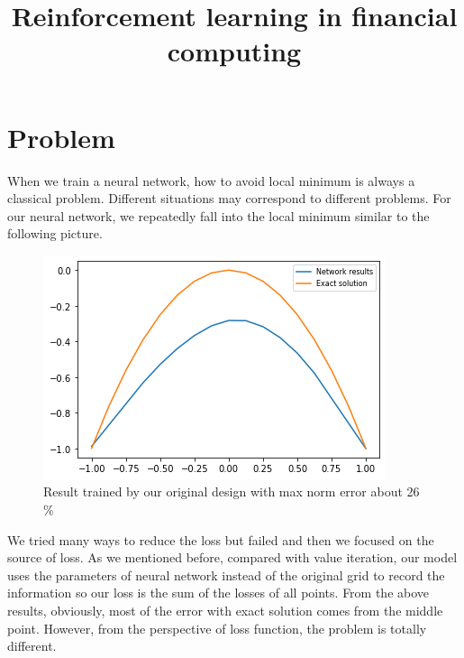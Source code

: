 \documentclass[11pt]{amsart}
\title{ Reinforcement learning in financial computing}
\begin{document}
\maketitle

\section{Problem}
When we train a neural network, how to avoid local minimum is always a classical problem. Different situations may correspond to different problems. For our neural network, we repeatedly fall into the local minimum similar to the following picture.

\begin{figure}[ht]
 
\centering
\includegraphics[scale=0.5]{result1.jpg}
\caption{Result trained by our original design with max norm error about 26$\%$}
\label{figl}
 
\end{figure}

We tried many ways to reduce the loss but failed and then we focused on the source of loss. As we mentioned before, compared with value iteration, our model uses the parameters of neural network instead of the original grid to record the information so our loss is the sum of the losses of all points. From the above results, obviously, most of the error with exact solution comes from the middle point. However, from the perspective of loss function, the problem is totally different.
\end{document}
